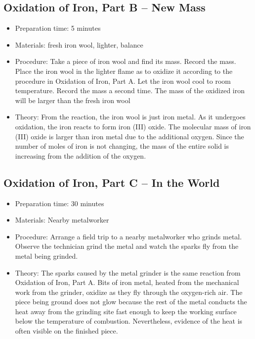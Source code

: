 \subsection{Oxidation of Iron, Part B -- New Mass}
\begin{itemize}
\item{Preparation time: 5 minutes}
\item{Materials: fresh iron wool, lighter, balance}
\item{Procedure: Take a piece of iron wool and find its mass. Record the mass. Place the iron wool in the lighter flame as to oxidize it according to the procedure in Oxidation of Iron, Part A. Let the iron wool cool to room temperature. Record the mass a second time. The mass of the oxidized iron will be larger than the fresh iron wool}
\item{Theory: From the reaction, the iron wool is just iron metal. As it undergoes oxidation, the iron reacts to form iron (III) oxide. The molecular mass of iron (III) oxide is larger than iron metal due to the additional oxygen. Since the number of moles of iron is not changing, the mass of the entire solid is increasing from the addition of the oxygen.}
\end{itemize}

\subsection{Oxidation of Iron, Part C -- In the World}
\begin{itemize}
\item{Preparation time: 30 minutes}
\item{Materials: Nearby metalworker}
\item{Procedure: Arrange a field trip to a nearby metalworker who grinds metal. Observe the technician grind the metal and watch the sparks fly from the metal being grinded.}
\item{Theory: The sparks caused by the metal grinder is the same reaction from Oxidation of Iron, Part A. Bits of iron metal, heated from the mechanical work from the grinder, oxidize as they fly through the oxygen-rich air. The piece being ground does not glow because the rest of the metal conducts the heat away from the grinding site fast enough to keep the working surface below the temperature of combustion. Nevertheless, evidence of the heat is often visible on the finished piece.}
\end{itemize}

